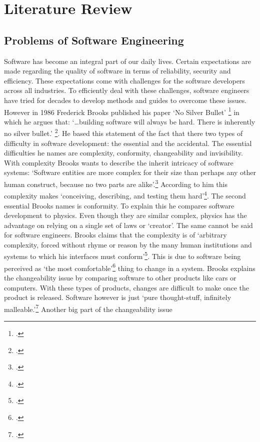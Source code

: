 \section{Literature Review}
\subsection{Problems of Software Engineering}
Software has become an integral part of our daily lives. Certain expectations are made regarding the quality of software in terms of reliability, security and efficiency. These expectations come with challenges for the software developers across all industries.
To efficiently deal with these challenges, software engineers have tried for decades to develop methods and guides to overcome these issues. However in 1986 Frederick Brooks published his paper `No Silver Bullet' \footcite{brooksNoSilverBullet1987} 
in which he argues that: `\ldots building software will always be hard. There is inherently no silver bullet.' \footcite[3]{brooksNoSilverBullet1987}. He based this statement of the fact that there two types of difficulty in software development: the essential and the accidental.
The essential difficulties he names are complexity, conformity, changeability and invisibility. With complexity Brooks wants to describe the inherit intricacy of software systems: `Software entities are more complex for their size than perhaps any other human construct, because no two parts are alike'.\footcite[3]{brooksNoSilverBullet1987}
According to him this complexity makes `conceiving, describing, and testing them hard'\footcite[3]{brooksNoSilverBullet1987}.
The second essential Brooks names is conformity. To explain this he compares software development to physics. Even though they are similar complex, physics has the advantage on relying on a single set of laws or `creator'. The same cannot be said for software engineers. Brooks claims that
the complexity is of `arbitrary complexity, forced without rhyme or reason by the many human institutions and systems to which his interfaces must conform'\footcite[4]{brooksNoSilverBullet1987}. This is due to software being perceived as `the most comfortable'\footcite[4]{brooksNoSilverBullet1987} thing to change in a system.
Brooks explains the changeability issue by comparing software to other products like cars or computers. With these types of products, changes are difficult to make once the product is released. Software however is just `pure thought-stuff, infinitely malleable.'\footcite[4]{brooksNoSilverBullet1987} Another big part of the changeability issue
